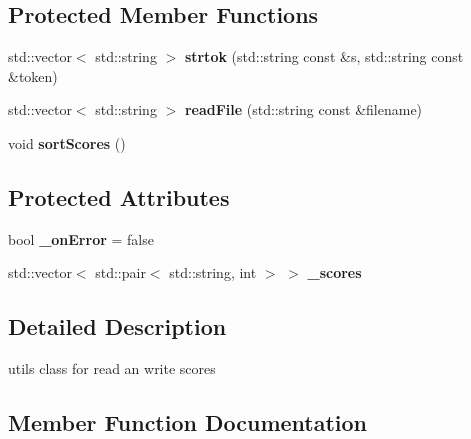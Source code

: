 \subsection*{Protected Member Functions}
\begin{DoxyCompactItemize}
\item 
\mbox{\label{class_highscore_core_a0818c9f9abda1ffe1c7a92ba5b786c97}} 
std\+::vector$<$ std\+::string $>$ {\bfseries strtok} (std\+::string const \&s, std\+::string const \&token)
\item 
\mbox{\label{class_highscore_core_a2782451af0ede796aebb38cde02250b5}} 
std\+::vector$<$ std\+::string $>$ {\bfseries read\+File} (std\+::string const \&filename)
\item 
\mbox{\label{class_highscore_core_a06eadb90bc265b782891da9f1544b071}} 
void {\bfseries sort\+Scores} ()
\end{DoxyCompactItemize}
\subsection*{Protected Attributes}
\begin{DoxyCompactItemize}
\item 
\mbox{\label{class_highscore_core_aa196303e37f40a1ea4134cc8a970dd8a}} 
bool {\bfseries \+\_\+on\+Error} = false
\item 
\mbox{\label{class_highscore_core_a117cf18d60ae402c75c9694e7fd96cda}} 
std\+::vector$<$ std\+::pair$<$ std\+::string, int $>$ $>$ {\bfseries \+\_\+scores}
\end{DoxyCompactItemize}


\subsection{Detailed Description}
utils class for read an write scores 

\subsection{Member Function Documentation}
\mbox{\label{class_highscore_core_a12de8f889c9990f769245fc967caa129}} 
